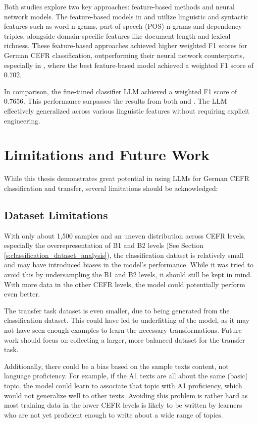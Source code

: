 Both studies explore two key approaches: feature-based methods and neural network models. The feature-based models in \cite{Vajjala2018} and \cite{Caines2020} utilize linguistic and syntactic features such as word n-grams, part-of-speech (POS) n-grams and dependency triples, alongside domain-specific features like document length and lexical richness. These feature-based approaches achieved higher weighted F1 scores for German CEFR classification, outperforming their neural network counterparts, especially in \cite{Caines2020}, where the best feature-based model achieved a weighted F1 score of 0.702.

In comparison, the fine-tuned classifier LLM achieved a weighted F1 score of 0.7656. This performance surpasses the results from both \cite{Vajjala2018} and \cite{Caines2020}. The LLM effectively generalized across various linguistic features without requiring explicit engineering.

\section{Limitations and Future Work}
\label{s:limitations_and_future_work}

While this thesis demonstrates great potential in using LLMs for German CEFR classification and transfer, several limitations should be acknowledged:

\subsection{Dataset Limitations}
\label{ss:dataset_limitations}
With only about 1,500 samples and an uneven distribution across CEFR levels, especially the overrepresentation of B1 and B2 levels (See Section \ref{s:classification_dataset_analysis}), the classification dataset is relatively small and may have introduced biases in the model's performance. While it was tried to avoid this by undersampling the B1 and B2 levels, it should still be kept in mind. With more data in the other CEFR levels, the model could potentially perform even better.

The transfer task dataset is even smaller, due to being generated from the classification dataset. This could have led to underfitting of the model, as it may not have seen enough examples to learn the necessary transformations. Future work should focus on collecting a larger, more balanced dataset for the transfer task.

Additionally, there could be a bias based on the sample texts content, not language proficiency. For example, if the A1 texts are all about the same (basic) topic, the model could learn to associate that topic with A1 proficiency, which would not generalize well to other texts. Avoiding this problem is rather hard as most training data in the lower CEFR levels is likely to be written by learners who are not yet proficient enough to write about a wide range of topics.

